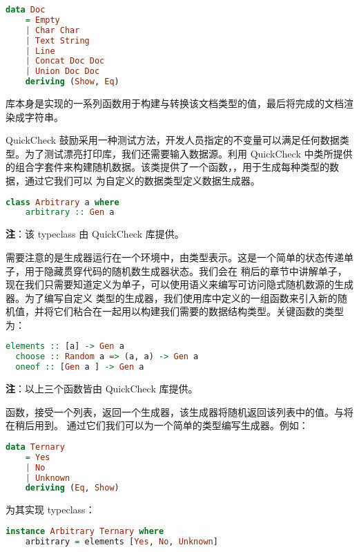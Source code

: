 \documentclass[./main.tex]{subfiles}
\begin{document}
\begin{lstlisting}[language=Haskell]
  data Doc
    = Empty
    | Char Char
    | Text String
    | Line
    | Concat Doc Doc
    | Union Doc Doc
    deriving (Show, Eq)
\end{lstlisting}

库本身是实现的一系列函数用于构建与转换该文档类型的值，最后将完成的文档渲染成字符串。

QuickCheck 鼓励采用一种测试方法，开发人员指定的不变量可以满足任何数据类型。为了测试漂亮打印库，我们还需要输入数据源。利用 QuickCheck
中类所提供的组合字套件来构建随机数据。该类提供了一个函数，，用于生成每种类型的数据，通过它我们可以
为自定义的数据类型定义数据生成器。

\begin{lstlisting}[language=Haskell]
  class Arbitrary a where
    arbitrary :: Gen a
\end{lstlisting}

\textbf{注}：该 typeclass 由 QuickCheck 库提供。

需要注意的是生成器运行在一个环境中，由类型表示。这是一个简单的状态传递单子，用于隐藏贯穿代码的随机数生成器状态。我们会在
稍后的章节中讲解单子，现在我们只需要知道定义为单子，可以使用语义来编写可访问隐式随机数源的生成器。为了编写自定义
类型的生成器，我们使用库中定义的一组函数来引入新的随机值，并将它们粘合在一起用以构建我们需要的数据结构类型。关键函数的类型为：

\begin{lstlisting}[language=Haskell]
  elements :: [a] -> Gen a
  choose :: Random a => (a, a) -> Gen a
  oneof :: [Gen a ] -> Gen a
\end{lstlisting}

\textbf{注}：以上三个函数皆由 QuickCheck 库提供。

函数，接受一个列表，返回一个生成器，该生成器将随机返回该列表中的值。与将在稍后用到。
通过它们我们可以为一个简单的类型编写生成器。例如：

\begin{lstlisting}[language=Haskell]
  data Ternary
    = Yes
    | No
    | Unknown
    deriving (Eq, Show)
\end{lstlisting}

为其实现 typeclass：

\begin{lstlisting}[language=Haskell]
  instance Arbitrary Ternary where
    arbitrary = elements [Yes, No, Unknown]
\end{lstlisting}
\end{document}
